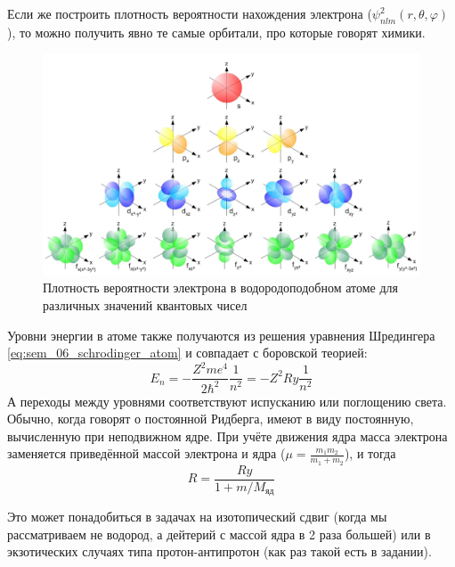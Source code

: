 \documentclass[12pt]{article}
\begin{document}
Если же построить плотность вероятности нахождения электрона ($\psi^2_{nlm}(r, \theta, \varphi)$), то можно получить явно те самые орбитали, про которые говорят химики.
\begin{figure}[h]
    \centering
    \includegraphics[width=\textwidth,height=\textheight,keepaspectratio]{Seminar_06/pics/Pic_03.jpg}
    \caption{Плотность вероятности электрона в водородоподобном атоме для различных значений квантовых чисел}
    \label{fig:sem_04_H_energy_levels}
\end{figure}
Уровни энергии в атоме также получаются из решения уравнения Шредингера \ref{eq:sem_06_schrodinger_atom} и совпадает с боровской теорией:
\begin{equation}
   E_n = -\dfrac{Z^2me^4}{2\hbar^2} \dfrac{1}{n^2} = -Z^2 Ry\dfrac{1}{n^2}
\end{equation}
А переходы между уровнями соответствуют испусканию или поглощению света. Обычно, когда говорят о постоянной Ридберга, имеют в виду постоянную, вычисленную при неподвижном ядре. При учёте движения ядра масса электрона заменяется приведённой массой электрона и ядра ($\mu = \frac{m_1 m_2}{m_1+m_2}$), и тогда
\begin{equation*}
    R=\dfrac{Ry}{1+m/M_{\text{яд}}}
\end{equation*}

Это может понадобиться в задачах на изотопический сдвиг (когда мы рассматриваем не водород, а дейтерий с массой ядра в 2 раза большей) или в экзотических случаях типа протон-антипротон (как раз такой есть в задании).
\end{document}
